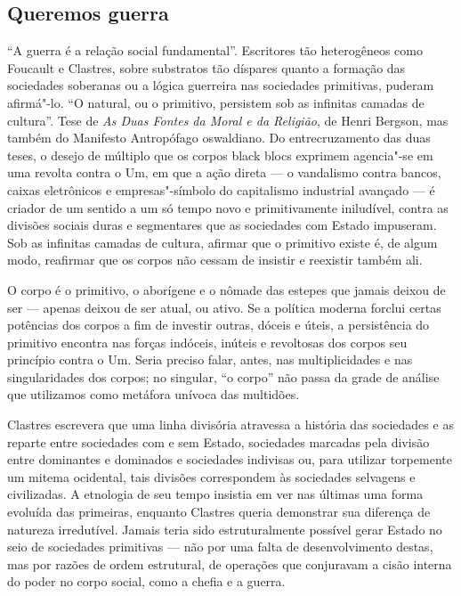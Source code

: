 \subsection{Queremos guerra}

``A guerra é a relação social fundamental''.
Escritores tão heterogêneos como Foucault e Clastres, sobre substratos
tão díspares quanto a formação das sociedades soberanas ou a lógica
guerreira nas sociedades primitivas, puderam afirmá"-lo. ``O natural, ou
o primitivo, persistem sob as infinitas camadas de cultura''. Tese de
\emph{As Duas Fontes da Moral e da Religião}, de Henri Bergson, mas também
do Manifesto Antropófago oswaldiano. Do entrecruzamento das duas teses,
o desejo de múltiplo que os corpos black blocs exprimem agencia"-se em
uma revolta contra o Um, em que a ação direta --- o vandalismo contra
bancos, caixas eletrônicos e empresas"-símbolo do capitalismo industrial
avançado --- é criador de um sentido a um só tempo novo e primitivamente
iniludível, contra as divisões sociais duras e segmentares que as
sociedades com Estado impuseram. Sob as infinitas camadas de cultura,
afirmar que o primitivo existe é, de algum modo, reafirmar que os corpos
não cessam de insistir e reexistir também ali.

O corpo é o primitivo, o aborígene e o nômade das estepes que jamais
deixou de ser --- apenas deixou de ser atual, ou ativo. Se a política
moderna forclui certas potências dos corpos a fim de investir outras,
dóceis e úteis, a persistência do primitivo encontra nas forças
indóceis, inúteis e revoltosas dos corpos seu princípio contra o Um.
Seria preciso falar, antes, nas multiplicidades e nas singularidades dos
corpos; no singular, ``o corpo'' não passa da grade de análise que
utilizamos como metáfora unívoca das multidões.

Clastres escrevera que uma linha divisória atravessa a história das
sociedades e as reparte entre sociedades com e sem Estado, sociedades
marcadas pela divisão entre dominantes e dominados e sociedades
indivisas ou, para utilizar torpemente um mitema ocidental, tais
divisões correspondem às sociedades selvagens e civilizadas. A etnologia
de seu tempo insistia em ver nas últimas uma forma evoluída das
primeiras, enquanto Clastres queria demonstrar sua diferença de natureza
irredutível. Jamais teria sido estruturalmente possível gerar Estado no
seio de sociedades primitivas --- não por uma falta de desenvolvimento
destas, mas por razões de ordem estrutural, de operações que conjuravam
a cisão interna do poder no corpo social, como a chefia e a guerra.


